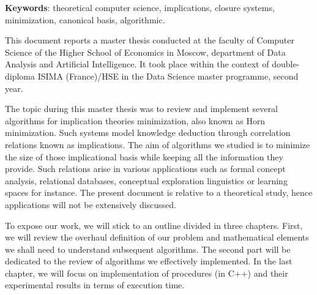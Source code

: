\documentclass[a4paper, 10pt]{report}
\begin{document}
\vspace{1.2em}

\textbf{Keywords}: theoretical computer science, implications, closure systems, minimization, canonical basis, algorithmic.

\tableofcontents



This document reports a master thesis conducted at the faculty of Computer Science of the Higher School of Economics in Moscow, department of Data Analysis and Artificial Intelligence. It took place within the context of double-diploma ISIMA (France)/HSE in the Data Science master programme, second year.

\vspace{1.2em}

The topic during this master thesis was to review and implement several algorithms for implication theories minimization, also known as Horn minimization. Such systems model knowledge deduction through correlation relations known as implications. The aim of algorithms we studied is to minimize the size of those implicational basis while
keeping all the information they provide. Such relations arise in various applications such as formal concept analysis, relational databases, conceptual exploration linguistics or learning spaces for instance. The present
document is relative to a theoretical study, hence applications will not be extensively discussed.

\vspace{1.2em}

To expose our work, we will stick to an outline divided in three chapters. First, we will review the overhaul definition of our problem and mathematical elements we shall need to understand subsequent algorithms. The second part will be dedicated to the review of algorithms we effectively implemented. In
the last chapter, we will focus on implementation of procedures (in C++) and their experimental results in terms of execution time.









\end{document}
